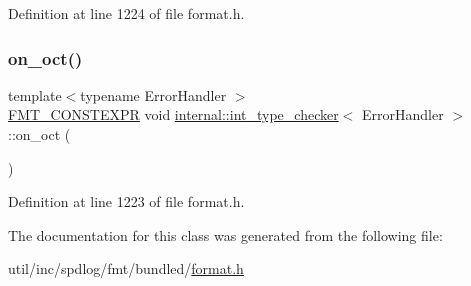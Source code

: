 Definition at line 1224 of file format.\+h.

\mbox{\label{classinternal_1_1int__type__checker_ac67ad988c660e553e4b09232c6450e3d}} 
\subsubsection{\texorpdfstring{on\+\_\+oct()}{on\_oct()}}
{\footnotesize\ttfamily template$<$typename Error\+Handler $>$ \\
\hyperlink{core_8h_a69201cb276383873487bf68b4ef8b4cd}{F\+M\+T\+\_\+\+C\+O\+N\+S\+T\+E\+X\+PR} void \hyperlink{classinternal_1_1int__type__checker}{internal\+::int\+\_\+type\+\_\+checker}$<$ Error\+Handler $>$\+::on\+\_\+oct (\begin{DoxyParamCaption}{ }\end{DoxyParamCaption})\hspace{0.3cm}{\ttfamily [inline]}}



Definition at line 1223 of file format.\+h.



The documentation for this class was generated from the following file\+:\begin{DoxyCompactItemize}
\item 
util/inc/spdlog/fmt/bundled/\hyperlink{format_8h}{format.\+h}\end{DoxyCompactItemize}

